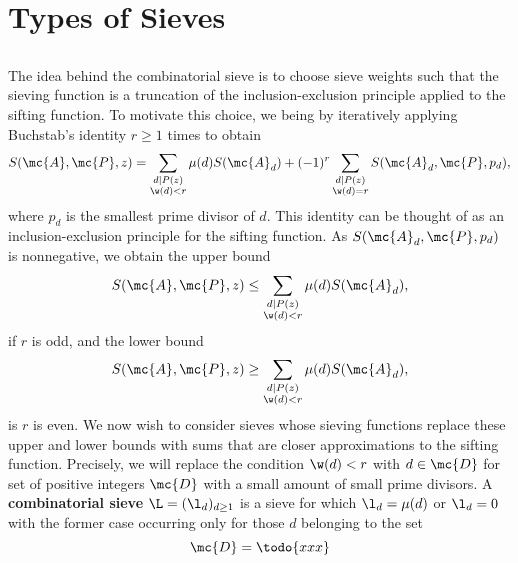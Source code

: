 \chapter{Types of Sieves}
  \section{}
    The idea behind the combinatorial sieve is to choose sieve weights such that the sieving function is a truncation of the inclusion-exclusion principle applied to the sifting function. To motivate this choice, we being by iteratively applying Buchstab's identity $r \ge 1$ times to obtain
    \[
      S(\mc{A},\mc{P},z) = \sum_{\substack{d \mid P(z) \\ \w(d) < r}}\mu(d)S(\mc{A}_{d})+(-1)^{r}\sum_{\substack{d \mid P(z) \\ \w(d) = r}}S(\mc{A}_{d},\mc{P},p_{d}),
    \]
    where $p_{d}$ is the smallest prime divisor of $d$. This identity can be thought of as an inclusion-exclusion principle for the sifting function. As $S(\mc{A}_{d},\mc{P},p_{d})$ is nonnegative, we obtain the upper bound
    \[
      S(\mc{A},\mc{P},z) \le \sum_{\substack{d \mid P(z) \\ \w(d) < r}}\mu(d)S(\mc{A}_{d}),
    \]
    if $r$ is odd, and the lower bound
    \[
      S(\mc{A},\mc{P},z) \ge \sum_{\substack{d \mid P(z) \\ \w(d) < r}}\mu(d)S(\mc{A}_{d}),
    \]
    is $r$ is even. We now wish to consider sieves whose sieving functions replace these upper and lower bounds with sums that are closer approximations to the sifting function. Precisely, we will replace the condition $\w(d) < r$ with $d \in \mc{D}$ for set of positive integers $\mc{D}$ with a small amount of small prime divisors. A \textbf{combinatorial sieve} $\L = (\l_{d})_{d \ge 1}$ is a sieve for which $\l_{d} = \mu(d)$ or $\l_{d} = 0$ with the former case occurring only for those $d$ belonging to the set
    \[
      \mc{D} = \todo{xxx}
    \]
  \section{}
  \section{}
